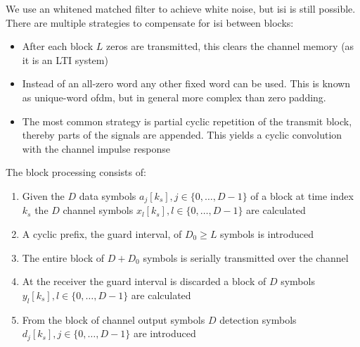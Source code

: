 We use an whitened matched filter to achieve white noise, but \ac{isi} is still
possible. There are multiple strategies to compensate for \ac{isi} between blocks:
\begin{itemize}
    \item
        After each block $L$ zeros are transmitted, this clears the channel memory
        (as it is an LTI system)
    \item
        Instead of an all-zero word any other fixed word can be used. This is known
        as unique-word \ac{ofdm}, but in general more complex than zero padding.
    \item
        The most common strategy is partial cyclic repetition of the transmit block,
        thereby parts of the signals are appended. This yields a cyclic convolution
        with the channel impulse response
\end{itemize}

The block processing consists of:
\begin{enumerate}
    \item Given the $D$ data symbols $a_j[k_s], j \in \{0, \ldots, D-1\}$ of a block
        at time index $k_s$ the $D$ channel symbols $x_l[k_s], l \in \{0, \ldots, D-1\}$
        are calculated
    \item A cyclic prefix, the guard interval, of $D_0 \geq L$ symbols is introduced
    \item The entire block of $D+D_0$ symbols is serially transmitted over the channel
    \item At the receiver the guard interval is discarded a block of $D$ symbols
        $y_l[k_s], l \in \{0, \ldots, D-1\}$ are calculated
    \item From the block of channel output symbols $D$ detection symbols $d_j[k_s],
        j \in \{0, \ldots, D-1\}$ are introduced
\end{enumerate}

